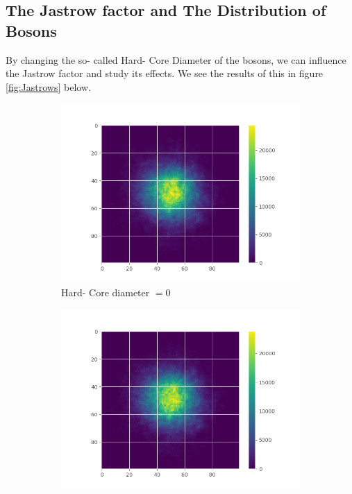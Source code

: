 \documentclass[11pt,a4paper,titlepage]{article}
\begin{document}
\subsection{The Jastrow factor and The Distribution of Bosons}
By changing the so- called Hard- Core Diameter of the bosons, we can influence the Jastrow factor and study its effects. We see the results of this in figure \ref{fig:Jastrows} below.

\begin{figure}[H]

\centering

\begin{subfigure}{.5\textwidth}
  \centering
\includegraphics[trim=3cm 0.0cm 1.5cm 0.0cm, clip=true,scale = 0.45]{NoJastrow_20.png}
\caption{Hard- Core diameter $= 0$}\label{J1}
\end{subfigure}%
\begin{subfigure}{.5\textwidth}
  \centering
\includegraphics[trim=3cm 0.0cm 1.5cm 0.0cm, clip=true,scale = 0.45]{Jastrow_20.png}

\end{subfigure}
\end{figure}
\end{document}
